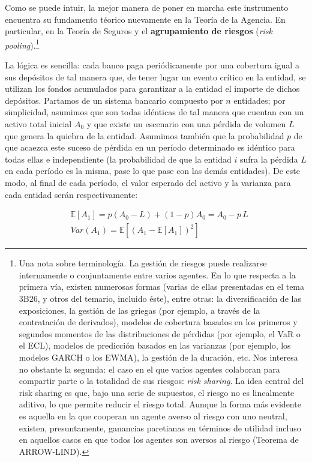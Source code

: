\documentclass[10pt,a4paper]{article}
\begin{document}
Como se puede intuir, la mejor manera de poner en marcha este instrumento encuentra su fundamento téorico nuevamente en la Teoría de la Agencia. En particular, en la Teoría de Seguros y el \textbf{agrupamiento de riesgos} (\textit{risk pooling}).\footnote{%
    Una nota sobre terminología. La gestión de riesgos puede realizarse internamente o conjuntamente entre varios agentes. En lo que respecta a la primera vía, existen numerosas formas (varias de ellas presentadas en el tema 3B26, y otros del temario, incluido éste), entre otras: la diversificación de las exposiciones, la gestión de las griegas (por ejemplo, a través de la contratación de derivados), modelos de cobertura basados en los primeros y segundos momentos de las distribuciones de pérdidas (por ejemplo, el VaR o el ECL), modelos de predicción basados en las varianzas (por ejemplo, los modelos GARCH o los EWMA), la gestión de la duración, etc. Nos interesa no obstante la segunda: el caso en el que varios agentes colaboran para compartir parte o la totalidad de sus riesgos: \textit{risk sharing}. La idea central del risk sharing es que, bajo una serie de supuestos, el riesgo no es linealmente aditivo, lo que permite reducir el riesgo total. Aunque la forma más evidente es aquella en la que cooperan un agente averso al riesgo con uno neutral, existen, presuntamente, ganancias paretianas en términos de utilidad incluso en aquellos casos en que todos los agentes son aversos al riesgo (Teorema de ARROW-LIND).
} 

La lógica es sencilla: cada banco paga periódicamente por una cobertura igual a sus depósitos de tal manera que, de tener lugar un evento crítico en la entidad, se utilizan los fondos acumulados para garantizar a la entidad el importe de dichos depósitos. Partamos de un sistema bancario compuesto por $n$ entidades; por simplicidad, asumimos que son todas idénticas de tal manera que cuentan con un activo total inicial $A_0$ y que existe un escenario con una pérdida de volumen $L$ que genera la quiebra de la entidad. Asumimos también que la probabilidad $p$ de que acaezca este suceso de pérdida en un período determinado es idéntico para todas ellas e independiente (la probabilidad de que la entidad $i$ sufra la pérdida $L$ en cada período es la misma, pase lo que pase con las demás entidades). De este modo, al final de cada período, el valor esperado del activo y la varianza para cada entidad serán respectivamente:

$$\begin{aligned}
    &\mathbb E[A_1]=p(A_0-L)+(1-p)A_0=A_0-p\,L\\
    &Var(A_1)=\mathbb E[(A_1-\mathbb E[A_1])^2]
\end{aligned}$$
\end{document}
